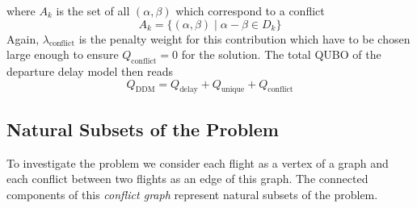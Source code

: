 \documentclass[aps,pra,twocolumn,10pt]{revtex4-1}
\begin{document}
where $A_k$ is the set of all $(\alpha, \beta)$ which correspond to a conflict
\begin{equation*}
    A_k = \{(\alpha, \beta) \; | \; \alpha - \beta \in D_k\}
\end{equation*}
Again, $\lambda_\text{conflict}$ is the penalty weight for this contribution which have to be chosen large enough to ensure $Q_\text{conflict}=0$ for the solution.
The total QUBO of the departure delay model then reads
\begin{equation*}
    Q_\text{DDM} = Q_\text{delay} + Q_\text{unique} + Q_\text{conflict}
\end{equation*}

\subsection{Natural Subsets of the Problem}
To investigate the problem we consider each flight as a vertex of a graph and each conflict between two flights as an edge of this graph.
The connected components of this \emph{conflict graph} represent natural subsets of the problem.

\end{document}
